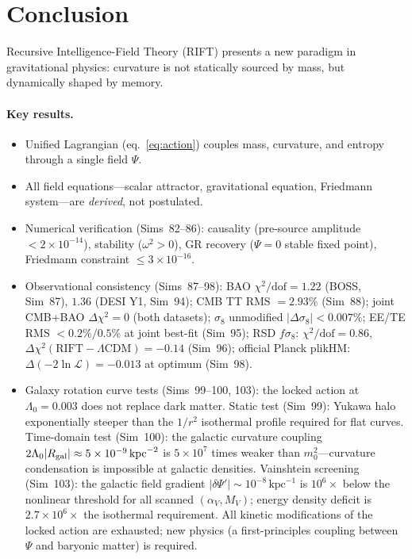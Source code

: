 \documentclass[12pt,a4paper]{article}
\begin{document}
\section{Conclusion}
\label{sec:conclusion}

Recursive Intelligence-Field Theory (RIFT) presents a new paradigm in gravitational
physics: curvature is not statically sourced by mass, but dynamically shaped by memory.

\paragraph{Key results.}
\begin{itemize}
  \item Unified Lagrangian (eq.~\eqref{eq:action}) couples mass, curvature, and entropy through a single field $\Psi$.
  \item All field equations---scalar attractor, gravitational equation, Friedmann system---are \emph{derived}, not postulated.
  \item Numerical verification (Sims~82--86): causality (pre-source amplitude $< 2\times 10^{-14}$), stability ($\omega^2 > 0$), GR recovery ($\Psi = 0$ stable fixed point), Friedmann constraint $\leq 3 \times 10^{-16}$.
  \item Observational consistency (Sims~87--98): BAO $\chi^2/\mathrm{dof} = 1.22$ (BOSS, Sim~87), $1.36$ (DESI Y1, Sim~94); CMB TT RMS $= 2.93\%$ (Sim~88); joint CMB+BAO $\Delta\chi^2 = 0$ (both datasets); $\sigma_8$ unmodified $|\Delta\sigma_8| < 0.007\%$; EE/TE RMS $< 0.2\%/0.5\%$ at joint best-fit (Sim~95); RSD $f\sigma_8$: $\chi^2/\mathrm{dof}=0.86$, $\Delta\chi^2(\mathrm{RIFT}-\Lambda\mathrm{CDM})=-0.14$ (Sim~96); official Planck plikHM: $\Delta(-2\ln\mathcal{L})=-0.013$ at optimum (Sim~98).
  \item Galaxy rotation curve tests (Sims~99--100, 103): the locked action at $\Lambda_0=0.003$ does not replace dark matter.  Static test (Sim~99): Yukawa halo exponentially steeper than the $1/r^2$ isothermal profile required for flat curves.  Time-domain test (Sim~100): the galactic curvature coupling $2\Lambda_0|R_{\rm gal}|\approx5\times10^{-9}\,{\rm kpc}^{-2}$ is $5\times10^7$ times weaker than $m_0^2$---curvature condensation is impossible at galactic densities.  Vainshtein screening (Sim~103): the galactic field gradient $|\delta\Psi'|\sim10^{-8}\,\mathrm{kpc}^{-1}$ is $10^6\times$ below the nonlinear threshold for all scanned $(\alpha_V,M_V)$; energy density deficit is $2.7\times10^6\times$ the isothermal requirement.  All kinetic modifications of the locked action are exhausted; new physics (a first-principles coupling between $\Psi$ and baryonic matter) is required.

\end{itemize}
\end{document}
